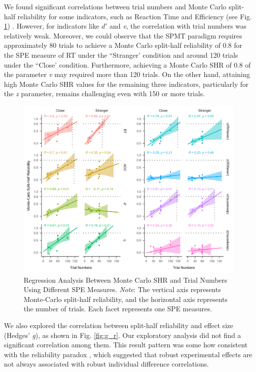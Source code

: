 \documentclass[sn-apa]{sn-jnl}%
\theoremstyle{thmstyleone}%
\theoremstyle{thmstyletwo}%
\theoremstyle{thmstylethree}%
\begin{document}
We found significant correlations between trial numbers and Monte Carlo split-half reliability for some indicators, such as Reaction Time and Efficiency (see Fig. \ref{fig:R_nTrial}) . However, for indicators like $d'$ and \textit{v}, the correlation with trial numbers was relatively weak. Moreover, we could observe that the SPMT paradigm requires approximately 80 trials to achieve a Monte Carlo split-half reliability of 0.8 for the SPE measure of RT under the ``Stranger' condition and around 120 trials under the ``Close' condition. Furthermore, achieving a Monte Carlo SHR of 0.8 of  the parameter \textit{v} may required more than 120 trials. On the other hand, attaining high Monte Carlo SHR values for the remaining three indicators, particularly for the \textit{z} parameter, remains challenging even with 150 or more trials.
\begin{figure}[!h]
	\centering
	\includegraphics[width=1\textwidth]{./Figure/Fig7_r&Trial.png}
	\caption[Regression Analysis Between Monte Carlo SHR and Trial Numbers Using Different SPE Measures.]{Regression Analysis Between Monte Carlo SHR and Trial Numbers Using Different SPE Measures.  \textit{Note}: The vertical axis represents Monte-Carlo split-half reliability, and the horizontal axis represents the number of trials. Each facet represents one SPE measures.
	}\label{fig:R_nTrial}
\end{figure}
\clearpage

We also explored the correlation between split-half reliability and effect size (Hedges’ \textit{g}), as shown in Fig. \ref{fig:g_r}. Our exploratory analysis did not find a significant correlation among them. This result pattern was some how consistent with the reliability paradox \parencite{logie1996group,hedge2018reliability}, which suggested that robust experimental effects are not always associated with robust individual difference correlations.
\end{document}
